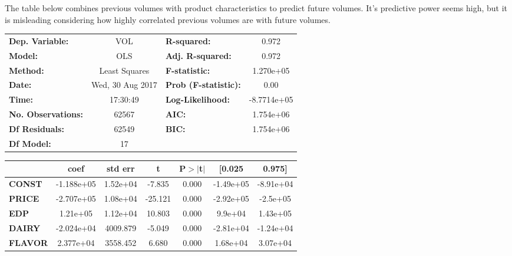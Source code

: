 \documentclass{article}
\begin{document}
The table below combines previous volumes with product characteristics to predict future volumes. It's predictive power seems high, but it is misleading considering how highly correlated previous volumes are with future volumes.

\begin{center}
\begin{tabular}{lclc}
\toprule
\textbf{Dep. Variable:}    &        VOL         & \textbf{  R-squared:         } &      0.972    \\
\textbf{Model:}            &       OLS        & \textbf{  Adj. R-squared:    } &      0.972    \\
\textbf{Method:}           &  Least Squares   & \textbf{  F-statistic:       } &  1.270e+05    \\
\textbf{Date:}             & Wed, 30 Aug 2017 & \textbf{  Prob (F-statistic):} &      0.00     \\
\textbf{Time:}             &     17:30:49     & \textbf{  Log-Likelihood:    } & -8.7714e+05   \\
\textbf{No. Observations:} &       62567      & \textbf{  AIC:               } &  1.754e+06    \\
\textbf{Df Residuals:}     &       62549      & \textbf{  BIC:               } &  1.754e+06    \\
\textbf{Df Model:}         &          17      & \textbf{                     } &               \\
\bottomrule
\end{tabular}
\begin{tabular}{lcccccc}
               & \textbf{coef} & \textbf{std err} & \textbf{t} & \textbf{P$>$$|$t$|$} & \textbf{[0.025} & \textbf{0.975]}  \\
\midrule
\textbf{CONST} &   -1.188e+05  &     1.52e+04     &    -7.835  &         0.000        &    -1.49e+05    &    -8.91e+04     \\
\textbf{PRICE}    &   -2.707e+05  &     1.08e+04     &   -25.121  &         0.000        &    -2.92e+05    &     -2.5e+05     \\
\textbf{EDP}    &     1.21e+05  &     1.12e+04     &    10.803  &         0.000        &      9.9e+04    &     1.43e+05     \\
\textbf{DAIRY}    &   -2.024e+04  &     4009.879     &    -5.049  &         0.000        &    -2.81e+04    &    -1.24e+04     \\
\textbf{FLAVOR}    &    2.377e+04  &     3558.452     &     6.680  &         0.000        &     1.68e+04    &     3.07e+04     \\

\end{tabular}
\end{center}
\end{document}

